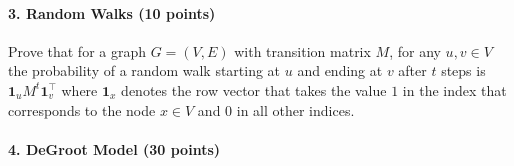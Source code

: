 \documentclass[11pt]{article}
\begin{document}
\paragraph{3. Random Walks (10 points)} 


Prove that for a graph $G=(V,E)$ with transition matrix $M$, for any $u,v \in V$ the probability of a random walk starting at $u$ and ending at $v$ after $t$ steps is $\mathbf{1}_{u}M^t\mathbf{1}^{\top}_{v}$ where $\mathbf{1}_{x}$ denotes the row vector that takes the value $1$ in the index that corresponds to the node $x \in V$ and 0 in all other indices.


\paragraph{4. DeGroot Model (30 points)} 
\end{document}
